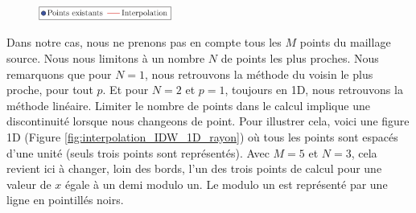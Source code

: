 \vspace{-0.5cm}

\begin{figure}[H]
    \centering
    \includegraphics[width=0.39\textwidth]{images/legende-interp3.png}
\end{figure}


Dans notre cas, nous ne prenons pas en compte tous les \(M\) points du maillage source. Nous nous limitons à un nombre \(N\) de points les plus proches. 
Nous remarquons que pour \( N = 1 \), nous retrouvons la méthode du voisin le plus proche, pour tout \( p \).
Et pour \( N = 2 \) et \( p = 1 \), toujours en 1D, nous retrouvons la méthode linéaire.
Limiter le nombre de points dans le calcul implique une discontinuité lorsque nous changeons de point. Pour illustrer cela, voici une figure 1D (Figure \ref{fig:interpolation_IDW_1D_rayon}) où tous les points sont espacés d'une unité (seuls trois points sont représentés). Avec \(M = 5\) et \(N = 3\), cela revient ici à changer, loin des bords, l'un des trois points de calcul pour une valeur de \(x\) égale à un demi modulo un. Le modulo un est représenté par une ligne en pointillés noirs.%


